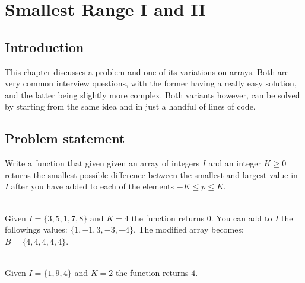 %



\chapter{Smallest Range \RN{1} and \RN{2}}
\label{ch:smallest_range}
\section*{Introduction}
This chapter discusses a problem and one of its variations on arrays. Both are very common
interview questions, with the former having a really easy solution, and the latter being slightly
more complex. Both variants however, can be solved by starting from the same idea and in just a handful of
lines of code.

\section{Problem statement}
\begin{exercise}
\label{example:smallest_range:exercice1}
Write a function that given given an array of integers $I$ and an integer $K \geq 0$ returns the smallest
possible difference between the smallest and largest value in $I$ after you have added to each of
the elements $-K \leq p \leq K$.

	\begin{example}
		\label{example:smallest_range:example1}
		\hfill \\
		Given $I = \{3,5,1,7,8\}$ and $K=4$ the function returns $0$. 
		You can add to $I$ the
		followings values: $\{1,-1,3,-3,-4\}$. The modified array becomes:
		$B=\{4,4,4,4,4\}$. 
	\end{example}

	\begin{example}
		\label{example:smallest_range:example2}
		\hfill \\
		Given $I = \{1,9,4\}$ and $K=2$ the function returns $4$.
	\end{example}
\end{exercise}

